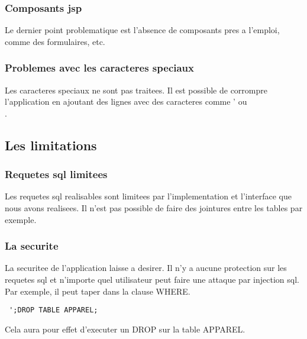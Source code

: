 \subsubsection{Composants jsp}
Le dernier point problematique est l'absence de composants pres a l'emploi, comme des formulaires, etc.
\subsubsection{Problemes avec les caracteres speciaux}
Les caracteres speciaux ne sont pas traitees. Il est possible de corrompre l'application en ajoutant des lignes avec des caracteres comme ' ou \\.
\subsection{Les limitations}
\subsubsection{Requetes sql limitees}
Les requetes sql realisables sont limitees par l'implementation et l'interface que nous avons realisees. Il n'est pas possible de faire des jointures entre les tables par exemple.
\subsubsection{La securite}
La securitee de l'application laisse a desirer. Il n'y a aucune protection sur les requetes sql et n'importe quel utilisateur peut faire une attaque par injection sql. 
Par exemple, il peut taper dans la clause WHERE.
\begin{verbatim}
 ';DROP TABLE APPAREL;
\end{verbatim}
Cela aura pour effet d'executer un DROP sur la table APPAREL.


